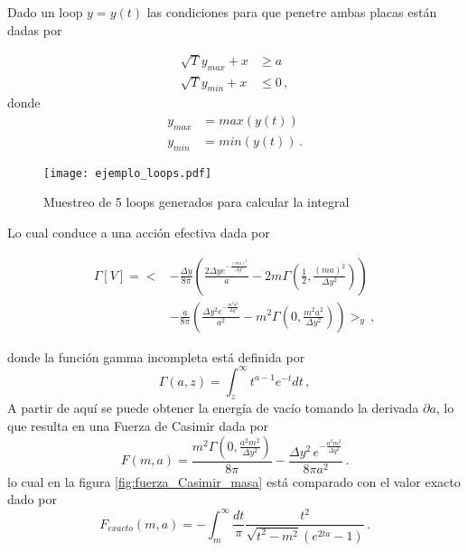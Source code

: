 Dado un loop $y = y(t)$ las condiciones para que penetre ambas placas están dadas por

\begin{align}
\label{condiciones}
\sqrt{T} y_{max} + x & \geq a \\
\sqrt{T} y_{min} + x & \leq 0 \, ,
\nonumber
\end{align}
donde 
\begin{align*}
y_{max}  &= max(y(t)) \\
y_{min}  &= min(y(t)) \, .
\end{align*}




\begin{figure}
    \centering
    \texttt{[image: ejemplo\_loops.pdf]}
    \caption{Muestreo de 5 loops generados para calcular la integral}
    \label{fig:ejemplo_loops}
\end{figure}



Lo cual conduce a una acción efectiva dada por

\begin{align}
\label{ec1.accion_efectiva}
\Gamma \left[ V \right] = 
 \Bigg<
&- \frac{\Delta y}{8 \pi}
	\left(
		\frac{2 \Delta y e^{-\frac{(m a)^2}{\Delta y ^2}}}{a}
		-2 m \Gamma \left( \frac{1}{2}, \frac{(m a)^2}{\Delta y ^2} \right)
	\right) \\
	&-  \frac{a}{8 \pi}
	\left(
		\frac{\Delta y ^2 e^{-\frac{m^2 a^2}{\Delta y^2}}}{a^2} -
		m^2 \Gamma \left( 0, \frac{m^2 a^2}{\Delta y ^2} \right)
	\right)	
\Bigg> _{y} 
\, ,
\nonumber
\end{align}

donde la función gamma incompleta está definida por
\begin{equation*}
\Gamma (a, z) = \int _{z} ^{\infty} t^{a-1} e ^{-t} dt
\, ,
\end{equation*}
A partir de aquí se puede obtener la energía de vacío tomando la derivada  $\partial a$, lo que resulta en una Fuerza de Casimir dada por
\begin{equation}
F (m,a) = 
\frac{m^2 \Gamma \left( 0 , \frac{a ^2 m^2}{\Delta y^2} \right)}{8 \pi}
- \frac{\Delta y^2 \, e ^ {-\frac{a ^2 m^2}{\Delta y^2}}}{8 \pi a^2 } 
\, .
\label{eq.fuerza.casimir.numerica}
\end{equation}
lo cual en la figura \eqref{fig:fuerza_Casimir_masa} está comparado con el valor exacto dado por
\begin{equation}
F _{exacto} (m,a) = - \int _{m} ^{ \infty } \frac{dt}{\pi} \frac{t^2}{\sqrt{t^2 -m^2}(e^{2 t a} -1)}
\, .
\end{equation}

